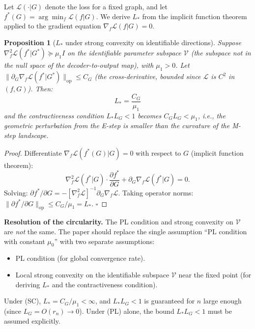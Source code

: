 \documentclass[11pt]{article}
\newtheorem{proposition}{Proposition}
\begin{document}
\begin{bridgebox}
Let $\mathcal{L}(\cdot | G)$ denote the loss for a fixed graph, and let
$f^*(G) = \arg\min_f \mathcal{L}(f|G)$. We derive $L_*$ from the implicit
function theorem applied to the gradient equation $\nabla_f \mathcal{L}(f|G)=0$.

\begin{proposition}[$L_*$ under strong convexity on identifiable directions]
Suppose $\nabla^2_f \mathcal{L}(f^*|G^*) \succeq \mu_1 I$ on the identifiable
parameter subspace $\mathcal{V}$ (the subspace not in the null space of the
decoder-to-output map), with $\mu_1 > 0$. Let
$\|\partial_G \nabla_f \mathcal{L}(f^*|G^*)\|_{\mathrm{op}} \le C_G$ (the
cross-derivative, bounded since $\mathcal{L}$ is $C^2$ in $(f,G)$). Then:
\[
    L_* = \frac{C_G}{\mu_1}
\]
and the contractiveness condition $L_* L_G < 1$ becomes
$C_G L_G < \mu_1$, i.e., the geometric perturbation from the E-step
is smaller than the curvature of the M-step landscape.
\end{proposition}

\begin{proof}
Differentiate $\nabla_f \mathcal{L}(f^*(G)|G) = 0$ with respect to $G$
(implicit function theorem):
\[
    \nabla^2_f \mathcal{L}(f^*|G) \cdot \frac{\partial f^*}{\partial G}
    + \partial_G \nabla_f \mathcal{L}(f^*|G) = 0.
\]
Solving: $\partial f^*/\partial G = -[\nabla^2_f \mathcal{L}]^{-1} \partial_G
\nabla_f \mathcal{L}$. Taking operator norms:
$\|\partial f^*/\partial G\|_{\mathrm{op}} \le C_G / \mu_1 = L_*$. $\square$
\end{proof}

\textbf{Resolution of the circularity.}
The PL condition and strong convexity on $\mathcal{V}$ are \emph{not} the same.
The paper should replace the single assumption ``PL condition with constant $\mu_0$''
with two separate assumptions:
\begin{itemize}
    \item[(PL)] PL condition (for global convergence rate).
    \item[(SC)] Local strong convexity on the identifiable subspace $\mathcal{V}$
    near the fixed point (for deriving $L_*$ and the contractiveness condition).
\end{itemize}
Under (SC), $L_* = C_G / \mu_1 < \infty$, and $L_* L_G < 1$ is guaranteed for
$n$ large enough (since $L_G = O(r_n) \to 0$). Under (PL) alone, the bound
$L_* L_G < 1$ must be assumed explicitly.
\end{bridgebox}
\end{document}
